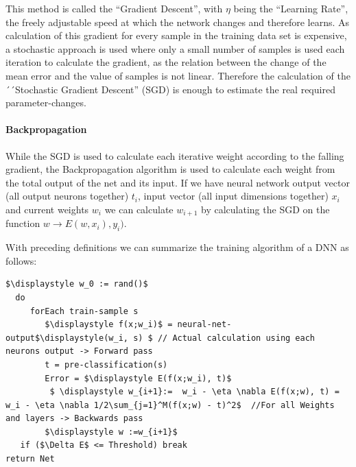 This method is called the ``Gradient Descent'', with \(\eta\) being the ``Learning Rate'', the freely adjustable speed at which the network changes and therefore learns. As calculation of this gradient for every sample in the training data set is expensive, a stochastic approach is used where only a small number of samples is used each iteration to calculate the gradient, as the relation between the change of the mean error and the value of samples is not linear. Therefore the calculation of the ´´Stochastic Gradient Descent'' (SGD) is enough to estimate the real required parameter-changes.

\paragraph{Backpropagation} While the SGD is used to calculate each iterative weight according to the falling gradient, the Backpropagation algorithm is used to calculate each weight from the total output of the net and its input. If we have neural network output vector (all output neurons together) \(t_i\), input vector (all input dimensions together) \(x_i\) and current weights \(w_i\) we can calculate \(w_{i+1}\) by calculating the SGD on the function \(w \rightarrow E(w, x_i), y_i)\).

With preceding definitions we can summarize the training algorithm of a DNN as follows:
\begin{lstlisting}[label=lst:pseudo:train,caption=Pseudo Code to show the Backpropagation/SGD algorithm in Action,mathescape]
 $\displaystyle w_0 := rand()$
  do
     forEach train-sample s
        $\displaystyle f(x;w_i)$ = neural-net-output$\displaystyle(w_i, s) $ // Actual calculation using each neurons output -> Forward pass
        t = pre-classification(s)
        Error = $\displaystyle E(f(x;w_i), t)$
         $ \displaystyle w_{i+1}:=  w_i - \eta \nabla E(f(x;w), t) = w_i - \eta \nabla 1/2\sum_{j=1}^M(f(x;w) - t)^2$  //For all Weights and layers -> Backwards pass
        $\displaystyle w :=w_{i+1}$
   if ($\Delta E$ <= Threshold) break
return Net
\end{lstlisting}
